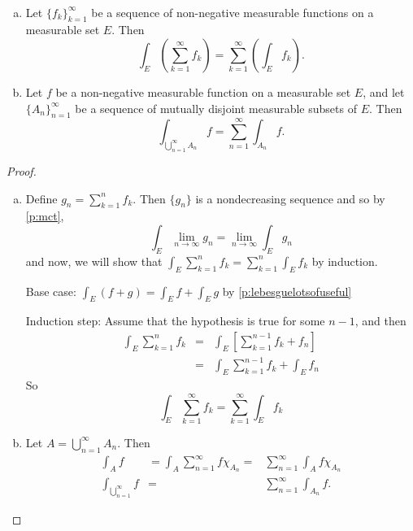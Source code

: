 \begin{pblm}\label{p:veryuseful}%
~
	\begin{enumerate}[(a)]
	\item Let $\{f_k\}_{k=1}^\infty$ be a sequence of non-negative measurable functions on a 
	measurable set $E$. Then 
	\begin{equation*}
		\int_E\left(\sum\limits_{k=1}^\infty f_k\right) = 
		\sum\limits_{k=1}^\infty\left(\int_Ef_k\right).
	\end{equation*}
	\item Let $f$ be a non-negative measurable function on a measurable set $E$, and let 
	$\{A_n\}_{n=1}^\infty$ be a sequence of mutually disjoint measurable subsets of $E$. 
	Then 
	\begin{equation*}
		\int_{\bigcup\limits_{n=1}^\infty A_n}f = \sum\limits_{n=1}^\infty\int_{A_n}f.
	\end{equation*}
	\end{enumerate}
\begin{proof}~
	\begin{enumerate}[(a)]
	\item Define $g_n = \sum\limits_{k=1}^nf_k$. Then $\{g_n\}$ is a nondecreasing 
		sequence and so by \ref{p:mct}, 
		\begin{equation*}
			\int_E\lim\limits_{n\to\infty}g_n = \lim\limits_{n\to\infty}\int_Eg_n
		\end{equation*}
		and now, we will show that $\int_E\sum\limits_{k=1}^nf_k = \sum\limits_{k=1}^n\int_Ef_k$ 
		by induction. 

		\noindent Base case: $\int_E (f + g) = \int_Ef + \int_Eg$ by \ref{p:lebesguelotsofuseful}

		\noindent Induction step: Assume that the hypothesis is true for some $n-1$, and then 
		\begin{equation*}
		\begin{array}{rcl}
			\int_E\sum\limits_{k=1}^nf_k &=& \int_E\left[\sum\limits_{k=1}^{n-1}f_k + f_n\right] \\
						&=& \int_E\sum\limits_{k=1}^{n-1}f_k+\int_Ef_n
		\end{array}
		\end{equation*}
		So 
		\begin{equation*}
			\int_E\sum\limits_{k=1}^\infty f_k = \sum\limits_{k=1}^\infty\int_Ef_k
		\end{equation*}
	\item Let $A = \bigcup\limits_{n=1}^\infty A_n$. Then 
	\begin{equation*}
	\begin{array}{rcl}
		\int_Af & = \int_A\sum\limits_{n=1}^\infty f\chi_{A_n} = & \sum\limits_{n=1}^\infty\int_Af\chi_{A_n}\\
		\int_{\bigcup\limits_{n=1}^\infty}f & = & \sum\limits_{n=1}^\infty\int_{A_n}f.
	\end{array}
	\end{equation*}
	\end{enumerate}
\end{proof}
\end{pblm}

